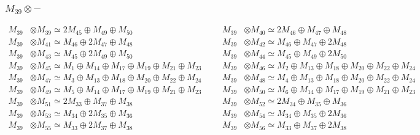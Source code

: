 \subsubsection{$ M_{39}\otimes -$}
\begin{align*}
M_{39} &\otimes M_{39} \simeq 2M_{45} \oplus M_{49} \oplus M_{50} &&& M_{39} &\otimes M_{40} \simeq 2M_{46} \oplus M_{47} \oplus M_{48}\\
M_{39} &\otimes M_{41} \simeq M_{46} \oplus 2M_{47} \oplus M_{48} &&& M_{39} &\otimes M_{42} \simeq M_{46} \oplus M_{47} \oplus 2M_{48}\\
M_{39} &\otimes M_{43} \simeq M_{45} \oplus 2M_{49} \oplus M_{50} &&& M_{39} &\otimes M_{44} \simeq M_{45} \oplus M_{49} \oplus 2M_{50}\\
M_{39} &\otimes M_{45} \simeq M_{1} \oplus M_{14} \oplus M_{17} \oplus M_{19} \oplus M_{21} \oplus M_{23} &&& M_{39} &\otimes M_{46} \simeq M_{2} \oplus M_{13} \oplus M_{18} \oplus M_{20} \oplus M_{22} \oplus M_{24}\\
M_{39} &\otimes M_{47} \simeq M_{3} \oplus M_{13} \oplus M_{18} \oplus M_{20} \oplus M_{22} \oplus M_{24} &&& M_{39} &\otimes M_{48} \simeq M_{4} \oplus M_{13} \oplus M_{18} \oplus M_{20} \oplus M_{22} \oplus M_{24}\\
M_{39} &\otimes M_{49} \simeq M_{5} \oplus M_{14} \oplus M_{17} \oplus M_{19} \oplus M_{21} \oplus M_{23} &&& M_{39} &\otimes M_{50} \simeq M_{6} \oplus M_{14} \oplus M_{17} \oplus M_{19} \oplus M_{21} \oplus M_{23}\\
M_{39} &\otimes M_{51} \simeq 2M_{33} \oplus M_{37} \oplus M_{38} &&& M_{39} &\otimes M_{52} \simeq 2M_{34} \oplus M_{35} \oplus M_{36}\\
M_{39} &\otimes M_{53} \simeq M_{34} \oplus 2M_{35} \oplus M_{36} &&& M_{39} &\otimes M_{54} \simeq M_{34} \oplus M_{35} \oplus 2M_{36}\\
M_{39} &\otimes M_{55} \simeq M_{33} \oplus 2M_{37} \oplus M_{38} &&& M_{39} &\otimes M_{56} \simeq M_{33} \oplus M_{37} \oplus 2M_{38}\\
\end{align*}


